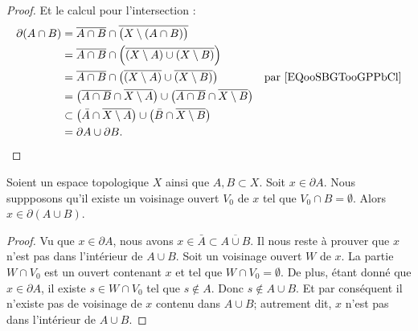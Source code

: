 \begin{proof}
	Et le calcul pour l'intersection :
	\begin{subequations}
		\begin{align}
			\partial(A\cap B) & =\overline{A\cap B}\cap\overline{\big(X\setminus(A\cap B)\big)}                                                                                               \\
			                  & =\overline{A\cap B}\cap \Big( \overline{(X\setminus A)\cup(X\setminus B)} \Big)                                                                               \\
			                  & =\overline{A\cap B}\cap\big( \overline{(X\setminus A)}\cup \overline{(X\setminus B)} \big)                              & \text{par \eqref{EQooSBGTooGPPbCl}} \\
			                  & =\big( \overline{A\cap B}\cap\overline{X\setminus A} \big)\cup\big( \overline{A\cap B}\cap\overline{X\setminus B} \big)                                       \\
			                  & \subset \big( \bar A\cap\overline{X\setminus A} \big)\cup \big( \bar B\cap\overline{X\setminus B} \big)                                                       \\
			                  & =\partial A\cup\partial B.
		\end{align}
	\end{subequations}
\end{proof}


\begin{proposition}	\label{PROPooIIRLooIPdjqO}
	Soient un espace topologique \( X\) ainsi que \( A,B\subset X\). Soit \( x\in\partial A\). Nous suppposons qu'il existe un voisinage ouvert \( V_0\) de \( x\) tel que \( V_0\cap B=\emptyset\). Alors \( x\in\partial(A\cup B)\).
\end{proposition}

\begin{proof}
	Vu que \( x\in\partial A\), nous avons \( x\in\bar A\subset \overline{A\cup B}\). Il nous reste à prouver que \( x\) n'est pas dans l'intérieur de \( A\cup B\). Soit un voisinage ouvert \( W\) de \( x\). La partie \( W\cap V_0\) est un ouvert contenant \( x\) et tel que \( W\cap V_0=\emptyset\). De plus, étant donné que \( x\in\partial A\), il existe \( s\in W\cap V_0\) tel que \( s\not\in A\). Donc \( s\not\in A\cup B\). Et par conséquent il n'existe pas de voisinage de \( x\) contenu dans \( A\cup B\); autrement dit, \( x\) n'est pas dans l'intérieur de \( A\cup B\).
\end{proof}

